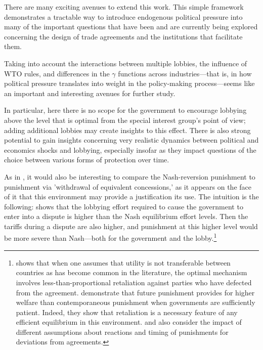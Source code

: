 \documentclass[12pt,titlepage]{article}
\newcommand{\ga}{\gamma}
\begin{document}
There are many exciting avenues to extend this work. This simple framework demonstrates a tractable way to introduce endogenous political pressure into many of the important questions that have been and are currently being explored concerning the design of trade agreements and the institutions that facilitate them.


Taking into account the interactions between multiple lobbies, the influence of WTO rules, and differences in the $\ga$ functions across industries---that is, in how political pressure translates into weight in the policy-making process---seems like an important and interesting avenues for further study.

In particular, here there is no scope for the government to encourage lobbying above the level that is optimal from the special interest group's point of view; adding additional lobbies may create insights to this effect. There is also strong potential to gain insights concerning very realistic dynamics between political and economics shocks and lobbying, especially insofar as they impact questions of the choice between various forms of protection over time.

As in \Textcite{zissimos}, it would also be interesting to compare the Nash-reversion punishment to punishment via 'withdrawal of equivalent concessions,' as it appears on the face of it that this environment may provide a justification its use. The intuition is the following: \Textcite{buzard2013a} shows that the lobbying effort required to cause the government to enter into a dispute is higher than the Nash equilibrium effort levels. Then the tariffs during a dispute are also higher, and punishment at this higher level would be more severe than Nash---both for the government and the lobby.\footnote{\Textcite{beshkar2010a} shows that when one assumes that utility is not transferable between countries as has become common in the literature, the optimal mechanism involves less-than-proportional retaliation against parties who have defected from the agreement. \Textcite{martinvergote} demonstrate that future punishment provides for higher welfare than contemporaneous punishment when governments are sufficiently patient. Indeed, they show that retaliation is a necessary feature of any efficient equilibrium in this environment. \Textcite{hungerford} and \Textcite{riezman1991} also consider the impact of different assumptions about reactions and timing of punishments for deviations from agreements.}
\end{document}
